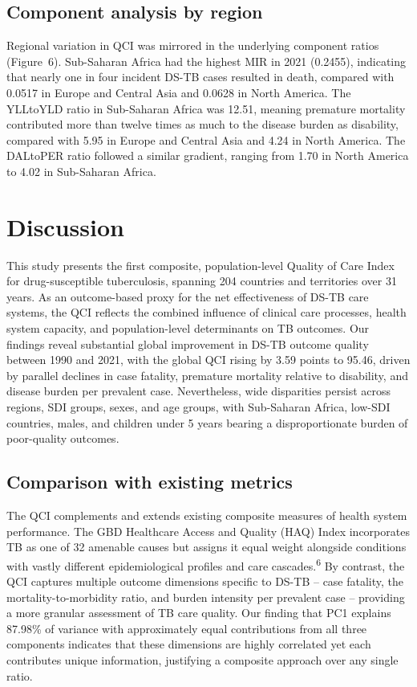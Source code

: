 \documentclass[12pt]{article}
\begin{document}
\subsection{Component analysis by region}

Regional variation in QCI was mirrored in the underlying component ratios (Figure~6). Sub-Saharan Africa had the highest MIR in 2021 (0.2455), indicating that nearly one in four incident DS-TB cases resulted in death, compared with 0.0517 in Europe and Central Asia and 0.0628 in North America. The YLLtoYLD ratio in Sub-Saharan Africa was 12.51, meaning premature mortality contributed more than twelve times as much to the disease burden as disability, compared with 5.95 in Europe and Central Asia and 4.24 in North America. The DALtoPER ratio followed a similar gradient, ranging from 1.70 in North America to 4.02 in Sub-Saharan Africa.


\section{Discussion}

This study presents the first composite, population-level Quality of Care Index for drug-susceptible tuberculosis, spanning 204 countries and territories over 31 years. As an outcome-based proxy for the net effectiveness of DS-TB care systems, the QCI reflects the combined influence of clinical care processes, health system capacity, and population-level determinants on TB outcomes. Our findings reveal substantial global improvement in DS-TB outcome quality between 1990 and 2021, with the global QCI rising by 3.59 points to 95.46, driven by parallel declines in case fatality, premature mortality relative to disability, and disease burden per prevalent case. Nevertheless, wide disparities persist across regions, SDI groups, sexes, and age groups, with Sub-Saharan Africa, low-SDI countries, males, and children under 5 years bearing a disproportionate burden of poor-quality outcomes.

\subsection{Comparison with existing metrics}

The QCI complements and extends existing composite measures of health system performance. The GBD Healthcare Access and Quality (HAQ) Index incorporates TB as one of 32 amenable causes but assigns it equal weight alongside conditions with vastly different epidemiological profiles and care cascades.\textsuperscript{6} By contrast, the QCI captures multiple outcome dimensions specific to DS-TB -- case fatality, the mortality-to-morbidity ratio, and burden intensity per prevalent case -- providing a more granular assessment of TB care quality. Our finding that PC1 explains 87.98\% of variance with approximately equal contributions from all three components indicates that these dimensions are highly correlated yet each contributes unique information, justifying a composite approach over any single ratio.
\end{document}
